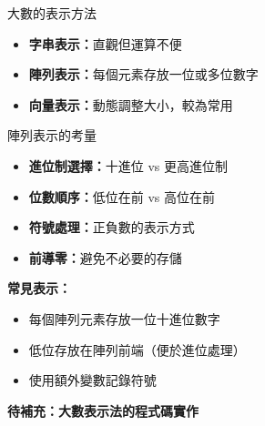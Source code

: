 \documentclass{beamer}
\begin{document}
\begin{frame}{大數的表示方法}
\begin{itemize}
    \item \textbf{字串表示：}直觀但運算不便
    \item \textbf{陣列表示：}每個元素存放一位或多位數字
    \item \textbf{向量表示：}動態調整大小，較為常用
\end{itemize}

\vspace{1em}
\begin{block}{陣列表示的考量}
\begin{itemize}
    \item \textbf{進位制選擇：}十進位 vs 更高進位制
    \item \textbf{位數順序：}低位在前 vs 高位在前
    \item \textbf{符號處理：}正負數的表示方式
    \item \textbf{前導零：}避免不必要的存儲
\end{itemize}
\end{block}

\vspace{1em}
\textbf{常見表示：}
\begin{itemize}
    \item 每個陣列元素存放一位十進位數字
    \item 低位存放在陣列前端（便於進位處理）
    \item 使用額外變數記錄符號
\end{itemize}

\vspace{1em}
\textbf{待補充：大數表示法的程式碼實作}
\end{frame}
\end{document}
